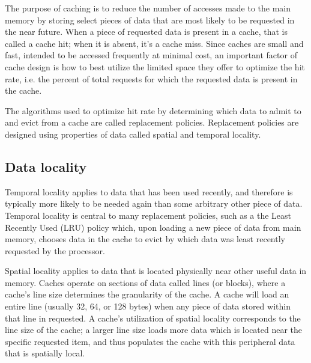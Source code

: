 \documentclass[12pt,twoside]{reedthesis}
\begin{document}
	The purpose of caching is to reduce the number of accesses made to the main memory by storing select pieces of data that are most likely to be requested in the near future. When a piece of requested data is present in a cache, that is called a cache hit; when it is absent, it's a cache miss. Since caches are small and fast, intended to be accessed frequently at minimal cost, an important factor of cache design is how to best utilize the limited space they offer to optimize the hit rate, i.e. the percent of total requests for which the requested data is present in the cache.
	
	The algorithms used to optimize hit rate by determining which data to admit to and evict from a cache are called replacement policies. Replacement policies are designed using properties of data called spatial and temporal locality.

	\subsection*{Data locality}
	
	Temporal locality applies to data that has been used recently, and therefore is typically more likely to be needed again than some arbitrary other piece of data. Temporal locality is central to many replacement policies, such as a the Least Recently Used (LRU) policy which, upon loading a new piece of data from main memory, chooses data in the cache to evict by which data was least recently requested by the processor.
	
	Spatial locality applies to data that is located physically near other useful data in memory. Caches operate on sections of data called lines (or blocks), where a cache's line size determines the granularity of the cache. A cache will load an entire line (usually 32, 64, or 128 bytes) when any piece of data stored within that line in requested. A cache's utilization of spatial locality corresponds to the line size of the cache; a larger line size loads more data which is located near the specific requested item, and thus populates the cache with this peripheral data that is spatially local.


\end{document}
